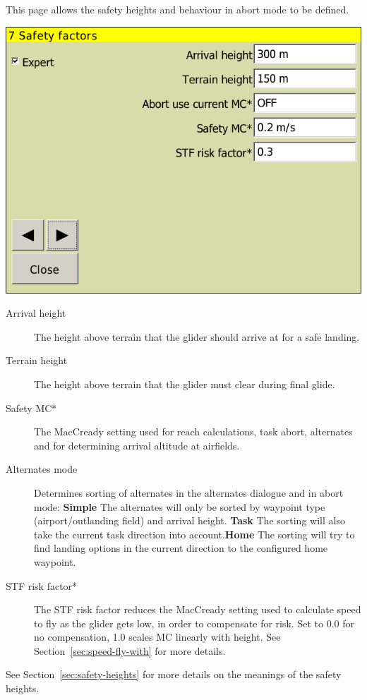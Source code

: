 This page allows the safety heights and behaviour in abort mode to be defined.

\begin{center}
\includegraphics[angle=0,width=0.8\linewidth,keepaspectratio='true']{figures/config-safety.png}
\end{center}

\begin{description}
\item[Arrival height]  The height above terrain that the glider
  should arrive at for a safe landing.
\item[Terrain height] \label{conf:safetyterrain} The height above terrain that the glider must
  clear during final glide.
\item[Safety MC*]  The MacCready setting used for reach calculations, task abort, alternates and
  for determining arrival altitude at airfields. 
\item[Alternates mode]\label{conf:alternatesmode}
Determines sorting of alternates in the alternates dialogue and in abort mode: {\bf Simple} The alternates will only be sorted by waypoint type (airport/outlanding field) and arrival height. {\bf Task} The sorting will also take the current task direction into account.{\bf Home} The sorting will try to find landing options in the current direction to the configured home waypoint.
\item[STF risk factor*] 
  The STF risk factor reduces the MacCready setting used to calculate
  speed to fly as the glider gets low, in order to compensate for
  risk.  Set to 0.0 for no compensation, 1.0 scales MC linearly with
  height.  See Section~\ref{sec:speed-fly-with} for more details.
\end{description}
See Section~\ref{sec:safety-heights} for more details on the meanings
of the safety heights.

